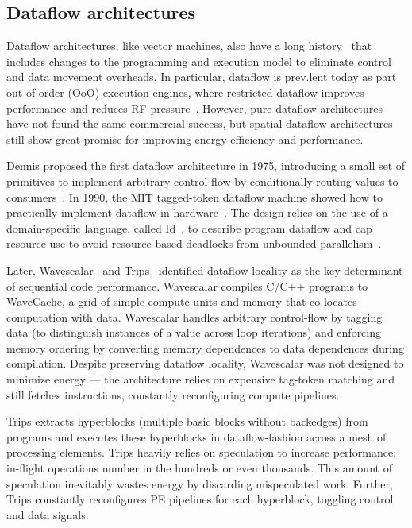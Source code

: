 \subsection{Dataflow architectures}
Dataflow architectures, like vector machines, also have a long history~\cite{dennis1975preliminary,dennis1980data,dennis1988efficient,ttda} that includes changes to the programming and execution model to eliminate control and data movement overheads.
% 
% 
In particular, dataflow is prev.lent today as part out-of-order (OoO) execution engines, where restricted dataflow improves performance and reduces RF
pressure~\cite{bracy2004dataflow,sassone2004dynamic,kim2002instruction,sembrant2015long,acsiliouglu2015lazy}.
% 
However, pure dataflow architectures have not found the same commercial success, but spatial-dataflow architectures still show great promise for improving energy efficiency and performance.

Dennis proposed the first dataflow architecture in 1975, introducing a small set of primitives to implement arbitrary control-flow by conditionally routing values to consumers~\cite{dennis1975preliminary}.
% 
In 1990, the MIT tagged-token dataflow machine showed how to practically implement dataflow in hardware~\cite{nikhil1990executing}.
% 
The design relies on the use of a domain-specific language, called Id~\cite{id}, to describe program dataflow and cap resource use to avoid resource-based deadlocks from unbounded parallelism~\cite{monsoon}.

Later, Wavescalar~\cite{swanson2003wavescalar} and Trips~\cite{trips} identified dataflow locality as the key determinant of sequential code performance.
% 
Wavescalar compiles C/C++ programs to WaveCache, a grid of simple compute units and memory that co-locates computation with data.
% 
Wavescalar handles arbitrary control-flow by tagging data (to distinguish instances of a value across loop iterations) and enforcing memory ordering by  converting memory dependences to data dependences during compilation.
% 
Despite preserving dataflow locality, Wavescalar was not designed to minimize energy --- the architecture relies on expensive tag-token matching and still fetches instructions, constantly reconfiguring compute pipelines.

Trips extracts hyperblocks (multiple basic blocks without backedges) from programs and executes these hyperblocks in dataflow-fashion across a mesh of processing elements.
% 
Trips heavily relies on speculation to increase performance; in-flight operations number in the hundreds or even thousands.
% 
This amount of speculation inevitably wastes energy by discarding mispeculated work.
% 
Further, Trips constantly reconfigures PE pipelines for each hyperblock, toggling control and data signals.

